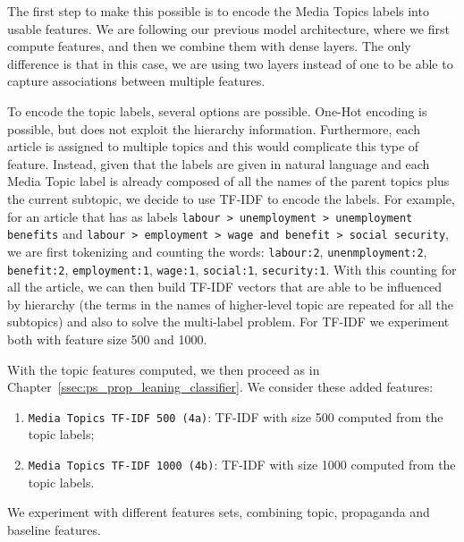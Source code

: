 The first step to make this possible is to encode the Media Topics labels into usable features. We are following our previous model architecture, where we first compute features, and then we combine them with dense layers. The only difference is that in this case, we are using two layers instead of one to be able to capture associations between multiple features.

To encode the topic labels, several options are possible. One-Hot encoding is possible, but does not exploit the hierarchy information. Furthermore, each article is assigned to multiple topics and this would complicate this type of feature. Instead, given that the labels are given in natural language and each Media Topic label is already composed of all the names of the parent topics plus the current subtopic, we decide to use TF-IDF to encode the labels.
For example, for an article that has as labels \texttt{labour > unemployment > unemployment benefits} and \texttt{labour > employment > wage and benefit > social security}, we are first tokenizing and counting the words: \texttt{labour:2}, \texttt{unenmployment:2}, \texttt{benefit:2}, \texttt{employment:1}, \texttt{wage:1}, \texttt{social:1}, \texttt{security:1}. With this counting for all the article, we can then build TF-IDF vectors that are able to be influenced by hierarchy (the terms in the names of higher-level topic are repeated for all the subtopics) and also to solve the multi-label problem.
For TF-IDF we experiment both with feature size 500 and 1000.

With the topic features computed, we then proceed as in Chapter~\ref{ssec:ps_prop_leaning_classifier}. We consider these added features:

\begin{enumerate}
    \item \texttt{Media Topics TF-IDF 500 (4a)}: TF-IDF with size 500 computed from the topic labels;
    \item \texttt{Media Topics TF-IDF 1000 (4b)}: TF-IDF with size 1000 computed from the topic labels.
\end{enumerate}

We experiment with different features sets, combining topic, propaganda and baseline features.

